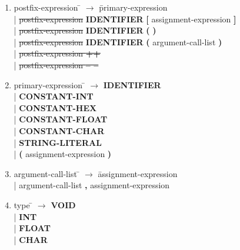 \documentclass[12pt]{article}
\begin{document}
\begin{enumerate}
\item \begin{tabbing} postfix-expression \= $\rightarrow$ \= primary-expression \\
	\> \hspace*{0.05cm} | \> \sout{postfix-expression} \textbf{IDENTIFIER} \textbf{[} assignment-expression \textbf{]} \\
	\> \hspace*{0.05cm} | \> \sout{postfix-expression} \textbf{IDENTIFIER} \textbf{(} \textbf{)} \\
	\> \hspace*{0.05cm} | \> \sout{postfix-expression} \textbf{IDENTIFIER} \textbf{(} argument-call-list \textbf{)} \\
	\> \hspace*{0.05cm} | \> \sout{postfix-expression \textbf{++}} \\
	\> \hspace*{0.05cm} | \> \sout{postfix-expression \textbf{-- --}} \\
\end{tabbing}

\item \begin{tabbing} primary-expression \= $\rightarrow$ \= \textbf{IDENTIFIER} \\
	\> \hspace*{0.05cm} | \> \textbf{CONSTANT-INT} \\
	\> \hspace*{0.05cm} | \> \textbf{CONSTANT-HEX} \\
	\> \hspace*{0.05cm} | \> \textbf{CONSTANT-FLOAT} \\
	\> \hspace*{0.05cm} | \> \textbf{CONSTANT-CHAR} \\
	\> \hspace*{0.05cm} | \> \textbf{STRING-LITERAL} \\
	\> \hspace*{0.05cm} | \> \textbf{(} assignment-expression \textbf{)} \\
\end{tabbing}

\item \begin{tabbing} argument-call-list \= $\rightarrow$ \= assignment-expression \\
	\> \hspace*{0.05cm} | \> argument-call-list \textbf{,} assignment-expression
\end{tabbing}

\item \begin{tabbing} type \= $\rightarrow$ \= \textbf{VOID} \\
	\> \hspace*{0.05cm} | \> \textbf{INT} \\
	\> \hspace*{0.05cm} | \> \textbf{FLOAT} \\
	\> \hspace*{0.05cm} | \> \textbf{CHAR}
\end{tabbing}

\end{enumerate}
\end{document}
